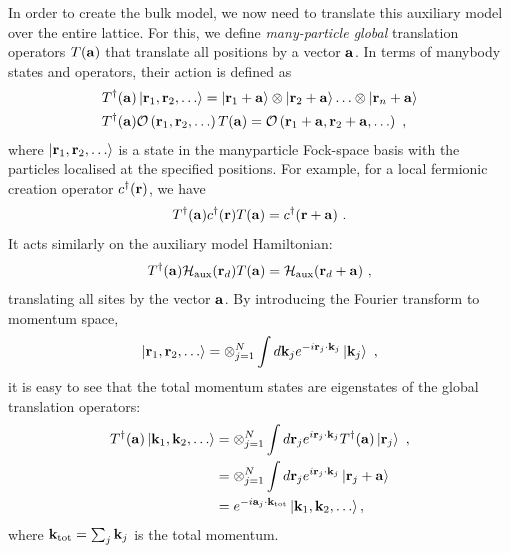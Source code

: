 \documentclass[reprint,hidelinks,onecolumn]{revtex4-2}
\begin{document}
In order to create the bulk model, we now need to translate this auxiliary model over the entire lattice. For this, we define {\it many-particle global} translation operators \(T({\bf a})\) that translate all positions by a vector \({\bf a}\). In terms of manybody states and operators, their action is defined as 
\begin{equation}\begin{aligned}\label{translationDefinition}
	&T^\dagger({\bf a}) \ket{{\bf r}_1, {\bf r}_2,\ldots} = \ket{{\bf r}_1 + {\bf a}}\otimes\ket{{\bf r}_2 + {\bf a}}\ldots\otimes\ket{{\bf r}_n + {\bf a}}\\
	&T^\dagger({\bf a}) \mathcal{O}\left({\bf r}_1, {\bf r}_2,\ldots\right)T({\bf a}) = \mathcal{O}\left({\bf r}_1 + {\bf a}, {\bf r}_2 + {\bf a},\ldots\right)~,
\end{aligned}\end{equation}
where \(\ket{{\bf r}_1, {\bf r}_2,\ldots}\) is a state in the manyparticle Fock-space basis with the particles localised at the specified positions. For example, for a local fermionic creation operator \(c^\dagger({\bf r})\), we have 
\begin{equation}\begin{aligned}
	T^\dagger({\bf a}) c^\dagger({\bf r}) T({\bf a}) = c^\dagger({\bf r} + {\bf a})~.
\end{aligned}\end{equation}
It acts similarly on the auxiliary model Hamiltonian:
\begin{equation}\begin{aligned}
	T^\dagger({\bf a})\mathcal{H}_\text{aux}({\bf r}_d)T({\bf a}) = \mathcal{H}_\text{aux}({\bf r}_d + {\bf a})~,
\end{aligned}\end{equation}
translating all sites by the vector \({\bf a}\). By introducing the Fourier transform to momentum space,
\begin{equation}\begin{aligned}
	\ket{{\bf r}_1, {\bf r}_2,\ldots} = \otimes_{j=1}^N \int d{\bf k}_j e^{-i {\bf r}_j\cdot{\bf k}_j} \ket{{\bf k}_j}~,
\end{aligned}\end{equation}
it is easy to see that the total momentum states are eigenstates of the global translation operators:
\begin{equation}\begin{aligned}
	T^\dagger({\bf a})\ket{{\bf k}_1, {\bf k}_2,\ldots} &= \otimes_{j=1}^N \int d{\bf r}_j e^{i {\bf r}_j\cdot{\bf k}_j} T^\dagger({\bf a})\ket{{\bf r}_j}~,\\
							    &=\otimes_{j=1}^N \int d{\bf r}_j e^{i {\bf r}_j\cdot{\bf k}_j} \ket{{\bf r}_j + {\bf a}}\\
							    &=e^{-i {\bf a}_j\cdot{\bf k}_\text{tot}}\ket{{\bf k}_1, {\bf k}_2,\ldots},
\end{aligned}\end{equation}
where \({\bf k}_\text{tot} = \sum_j {\bf k}_j\) is the total momentum.
\end{document}
